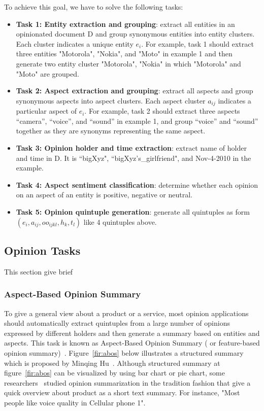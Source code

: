 \documentclass{article}
\begin{document}
To achieve this goal, we have to solve the following tasks:
\begin{itemize}
	\item \textbf{Task 1: Entity extraction and grouping}: extract all entities in an opinionated document D and group synonymous entities into entity clusters. Each cluster indicates a unique entity $e_i$. For example, task 1 should extract three entities "Motorola", "Nokia", and "Moto" in example 1 and then generate two entity cluster "Motorola", "Nokia" in which "Motorola" and "Moto" are grouped.
	\item \textbf{Task 2: Aspect extraction and grouping}: extract all aspects and group synonymous aspects into aspect clusters. Each aspect cluster $a_{ij}$ indicates a particular aspect of $e_i$. For example, task 2 should extract three aspects “camera”, “voice”, and “sound” in example 1, and group “voice” and “sound” together as they are synonyms representing the same aspect.
	\item \textbf{Task 3: Opinion holder and time extraction}: extract name of holder and time in D. It is “bigXyz", “bigXyz's\_girlfriend", and Nov-4-2010 in the example.
	\item \textbf{Task 4: Aspect sentiment classification}: determine whether each opinion on an aspect of an entity is positive, negative or neutral. 
	\item \textbf{Task 5: Opinion quintuple generation}: generate all quintuples as form $(e_i, a_{ij}, oo_{ijkl}, h_k, t_l)$ like 4 quintuples above.
\end{itemize}


\subsection{Opinion Tasks}
This section give brief 
\subsubsection{Aspect-Based Opinion Summary}

To give a general view about a product or a service, most opinion applications should automatically extract quintuples from a large number of opinions expressed by different holders and then generate a summary based on entities and aspects.
This task is known as Aspect-Based Opinion Summary ( or feature-based opinion summary)~\cite{Hu:2004:MSC:1014052.1014073, Liu:2005:OOA:1060745.1060797}.
Figure~\ref{fir:abos} below illustrates a structured summary which is proposed by 	Minqing Hu~\cite{Hu:2004:MSC:1014052.1014073}. 
Although structured summary at figure~\ref{fir:abos} can be visualized by using bar chart or pie chart, some researchers~\cite{Beineke04anexploration,COIN:COIN417,Ku2016,Seki06opinion-focusedsummarization,Stoyanov:2006:PSC:1610075.1610123} studied opinion summarization in the tradition fashion that give a quick overview about product as a short text summary. 
For instance, "Most people like voice quality in Cellular phone 1".
\end{document}
